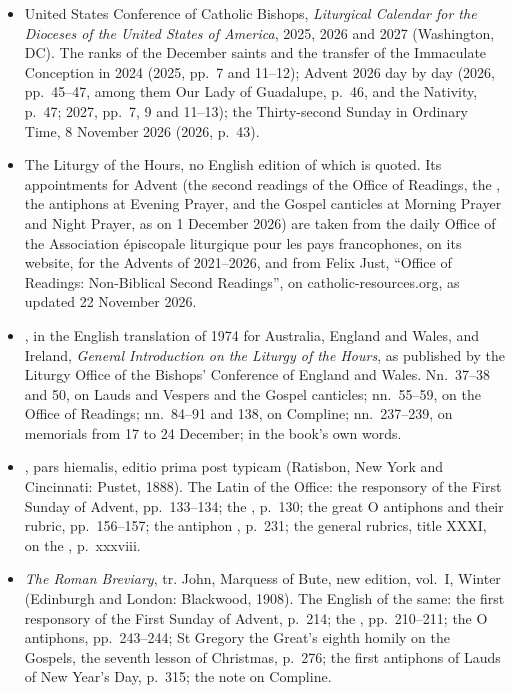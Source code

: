 \begin{itemize}[leftmargin=1.3em, itemsep=0.3em]
pp.~60--61.
\item United States Conference of Catholic Bishops, \textit{Liturgical Calendar for the Dioceses
of the United States of America}, 2025, 2026 and 2027 (Washington, DC). The ranks of the December
saints and the transfer of the Immaculate Conception in 2024 (2025, pp.~7 and 11--12); Advent 2026
day by day (2026, pp.~45--47, among them Our Lady of Guadalupe, p.~46, and the Nativity, p.~47;
2027, pp.~7, 9 and 11--13); the Thirty-second Sunday in Ordinary Time, 8 November 2026 (2026,
p.~43).
\item The Liturgy of the Hours, no English edition of which is quoted. Its appointments for Advent
(the second readings of the Office of Readings, the , the antiphons at Evening
Prayer, and the Gospel canticles at Morning Prayer and Night Prayer, as on 1 December 2026) are
taken from the daily Office of the Association épiscopale liturgique pour les pays
francophones, on its website, for the Advents of 2021--2026, and from Felix Just, ``Office of
Readings: Non-Biblical Second Readings'', on catholic-resources.org, as updated 22 November 2026.
\item {}, in the English translation of 1974 for
Australia, England and Wales, and Ireland, \textit{General Introduction on the Liturgy of the
Hours}, as published by the Liturgy Office of the Bishops' Conference of England and Wales.
Nn.~37--38 and 50, on Lauds and Vespers and the Gospel canticles; nn.~55--59, on the Office of
Readings; nn.~84--91 and 138, on Compline; nn.~237--239, on memorials from 17 to 24 December; in
the book's own words.
\item {}, pars hiemalis, editio prima post typicam (Ratisbon, New York and
Cincinnati: Pustet, 1888). The Latin of the Office: the responsory  of
the First Sunday of Advent, pp.~133--134; the , p.~130; the great
O antiphons and their rubric, pp.~156--157; the antiphon ,
p.~231; the general rubrics, title XXXI, on the , p.~xxxviii.
\item \textit{The Roman Breviary}, tr. John, Marquess of Bute, new edition, vol.~I, Winter
(Edinburgh and London: Blackwood, 1908). The English of the same: the first responsory of the
First Sunday of Advent, p.~214; the , pp.~210--211; the O antiphons,
pp.~243--244; St Gregory the Great's eighth homily on the Gospels, the seventh lesson of
Christmas, p.~276; the first antiphons of Lauds of New Year's Day, p.~315; the note on Compline.

\end{itemize}
